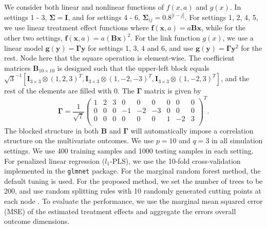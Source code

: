 \documentclass[smallextended]{svjour3}
\begin{document}
We consider both linear and nonlinear functions of $f(x, a)$ and $g(x)$. In settings 1 - 3, $\bm \Sigma = \bm I$, and for settings 4 - 6, $\bm \Sigma_{ij} = 0.8^{|i-j|}$. For settings 1, 2, 4, 5, we use linear treatment effect functions where $\bm f(\textbf{x}, a) = a\textbf{B}\textbf{x}$, while for the other two settings, $\bm f(\textbf{x}, a) = a(\textbf{B}\textbf{x})^2$. For the link function $g(x)$, we use a linear model $\bm g(\textbf{y}) = \bm \Gamma\textbf{y}$ for settings 1, 3, 4 and 6, and use $\bm g(\textbf{y}) = \bm \Gamma\textbf{y}^2$ for the rest. Node here that the square operation is element-wise. The coefficient matrices $\bm{B}_{10 \times 10}$ is designed such that the upper-left block equals $\sqrt{3}^{-1} [ \mathbf{I}_{3 \times 3}  \otimes (1,2,3)^T, \mathbf{I}_{3 \times 3} \otimes (1,-2,-3)^T, \mathbf{I}_{3 \times 3} \otimes (1,-2,3)^T ]$, and the rest of the elements are filled with 0. The $\bm \Gamma$ matrix is given by 
$$
  \bm \Gamma = \frac{1}{\sqrt{7}}
  \begin{pmatrix}{}
  1 & 2 & 3 & 0 & 0 & 0 & 0 & 0 & 0 \\
  0 & 0 & 0 & -1 & -2 & -3 & 0 & 0 & 0 \\
  0 & 0 & 0 & 0 & 0 & 0 & 1 & -2 & 3 \\
  \end{pmatrix}^T.
$$
The blocked structure in both $\bm B$ and $\bm \Gamma$ will automatically impose a correlation structure on the multivariate outcomes. We use $p=10$ and $q = 3$ in all simulation settings. We use 400 training samples and 1000 testing samples in each setting. For penalized linear regression ($l_1$-PLS), we use the 10-fold cross-validation implemented in the \texttt{glmnet} package. For the marginal random forest method, the default tuning is used. For the proposed method, we set the number of trees to be 200, and use random splitting rules with 10 randomly generated cutting points at each node \cite{geurts2006extremely}. To evaluate the performance, we use the marginal mean squared error (MSE) of the estimated treatment effects and aggregate the errors overall outcome dimensions. 
\end{document}

